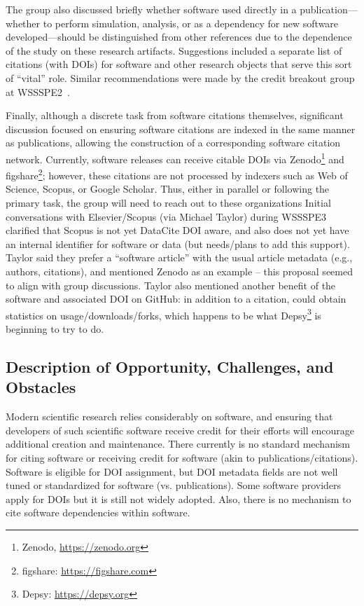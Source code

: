 The group also discussed briefly whether software used directly in 
a publication---whether to perform simulation, analysis, or as a dependency 
for new software developed---should be distinguished from other references 
due to the dependence of the study on these research artifacts.
Suggestions included a separate list of citations (with DOIs) for software 
and other research objects that serve this sort of ``vital'' role.
Similar recommendations were made by the credit breakout group at 
WSSSPE2~\cite{WSSSPE2}.

Finally, although a discrete task from software citations themselves, significant 
discussion focused on ensuring software citations are indexed in the same 
manner as publications, allowing the construction of a corresponding 
software citation network.
Currently, software releases can receive citable DOIs via 
Zenodo\footnote{Zenodo, \url{https://zenodo.org}} and 
figshare\footnote{figshare: \url{https://figshare.com}}; however, these 
citations are not processed by indexers such as Web of Science, Scopus, 
or Google Scholar.
Thus, either in parallel or following the primary task, the group will 
need to reach out to these organizations 
Initial conversations with Elsevier\slash Scopus (via Michael Taylor) 
during WSSSPE3 clarified that Scopus is not yet DataCite DOI aware, and 
also does not yet have an internal identifier for software or data (but 
needs\slash plans to add this support).
Taylor said they prefer a ``software article'' with the usual 
article metadata (e.g., authors, citations), and mentioned Zenodo as an 
example -- this proposal seemed to align with group discussions.
Taylor also mentioned another benefit of the software and associated DOI 
on GitHub: in addition to a citation, could obtain statistics on 
usage/downloads/forks, which happens to be what Depsy\footnote{Depsy: \url{https://depsy.org}} is beginning to try to do.

\subsection{Description of Opportunity, Challenges, and Obstacles}

Modern scientific research relies considerably on software, and ensuring 
that developers of such scientific software receive credit for their efforts 
will encourage additional creation and maintenance. 
There currently is no standard mechanism for citing software or receiving credit for software (akin to publications/citations).
Software is eligible for DOI assignment, but DOI metadata fields are not well tuned or standardized for software (vs. publications).
Some software providers apply for DOIs but it is still not widely adopted.
Also, there is no mechanism to cite software dependencies within software.

